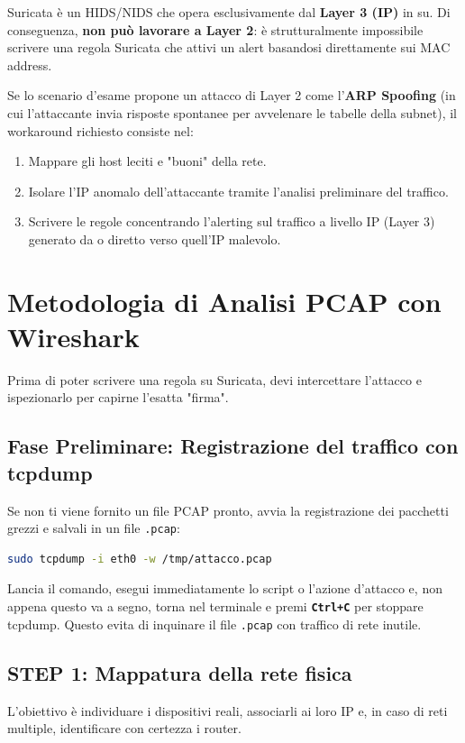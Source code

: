 \documentclass[12pt,a4paper]{report}
\begin{document}
	\begin{nota}
		Suricata è un HIDS/NIDS che opera esclusivamente dal \textbf{Layer 3 (IP)} in su. Di conseguenza, \textbf{non può lavorare a Layer 2}: è strutturalmente impossibile scrivere una regola Suricata che attivi un alert basandosi direttamente sui MAC address.
		
		Se lo scenario d'esame propone un attacco di Layer 2 come l'\textbf{ARP Spoofing} (in cui l'attaccante invia risposte spontanee per avvelenare le tabelle della subnet), il workaround richiesto consiste nel:
		\begin{enumerate}
			\item Mappare gli host leciti e "buoni" della rete.
			\item Isolare l'IP anomalo dell'attaccante tramite l'analisi preliminare del traffico.
			\item Scrivere le regole concentrando l'alerting sul traffico a livello IP (Layer 3) generato da o diretto verso quell'IP malevolo.
		\end{enumerate}
	\end{nota}
	
	\section{Metodologia di Analisi PCAP con Wireshark}
	Prima di poter scrivere una regola su Suricata, devi intercettare l'attacco e ispezionarlo per capirne l'esatta "firma". 
	
	\subsection*{Fase Preliminare: Registrazione del traffico con tcpdump}
	Se non ti viene fornito un file PCAP pronto, avvia la registrazione dei pacchetti grezzi e salvali in un file \texttt{.pcap}:
	\begin{lstlisting}[language=bash]
		sudo tcpdump -i eth0 -w /tmp/attacco.pcap
	\end{lstlisting}
	\begin{nota}
		Lancia il comando, esegui immediatamente lo script o l'azione d'attacco e, non appena questo va a segno, torna nel terminale e premi \textbf{\texttt{Ctrl+C}} per stoppare tcpdump. Questo evita di inquinare il file \texttt{.pcap} con traffico di rete inutile.
	\end{nota}
	
	\subsection{STEP 1: Mappatura della rete fisica}
	L'obiettivo è individuare i dispositivi reali, associarli ai loro IP e, in caso di reti multiple, identificare con certezza i router.
	
\end{document}
